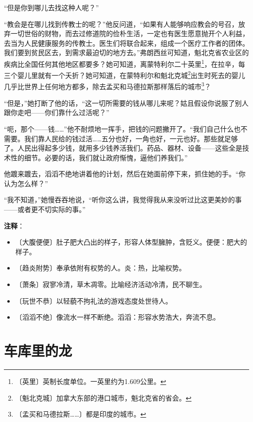 \documentclass[12pt,UTF-8,openany]{ctexbook}
\begin{document}
\begin{normalsize}
    “但是你到哪儿去找这种人呢？”
    
    “教会是在哪儿找到传教士的呢？”他反问道，“如果有人能够响应教会的号召，放弃一切世俗的财物，而去过修道院的俭朴生活，一定也有医生愿意抛开个人利益，去当为人民健康服务的传教士。医生们将联合起来，组成一个医疗工作者的团体。我们要到贫民区去，到需求最迫切的地方去。”弗朗西丝可知道，魁北克省农业区的疾病比全国任何其他地区都要多？她可知道，离蒙特利尔二十英里\footnote{〔英里〕英制长度单位。一英里约为1.609公里。}，在拉辛，每三个婴儿里就有一个夭折？她可知道，在蒙特利尔和魁北克城\footnote{〔魁北克城〕加拿大东部的港口城市，魁北克省的省会。}出生时死去的婴儿几乎比世界上任何地方都多，除去孟买和马德拉斯那样落后的城市\footnote{〔孟买和马德拉斯……〕都是印度的城市。}？
    
    “但是，”她打断了他的话，“这一切所需要的钱从哪儿来呢？姑且假设你说服了别人跟你走吧——你们靠什么过活呢？”
    
    “呃，那个——钱……”他不耐烦地一挥手，把钱的问题撇开了。“我们自己什么也不需要。我们靠人民给的钱过活……五分也好，一角也好，一元也好。那些就足够了。人民出得起多少钱，就用多少钱养活我们。药品、器材、设备——这些全是技术性的细节。必要的话，我们就让政府惭愧，逼他们养我们。”
    
    他踱来踱去，滔滔不绝地讲着他的计划，然后在她面前停下来，抓住她的手。“你认为怎么样？”
    
    “我不知道，”她慢吞吞地说，“听你这么讲，我觉得我从来没听过比这更美妙的事——或者更不切实际的事。”
    
\end{normalsize}


\newpage

\textbf{注释}：

\vspace{-1em}

\begin{itemize}
    \setlength\itemsep{-0.2em}
    \item 〔大腹便便〕肚子肥大凸出的样子，形容人体型臃肿，含贬义。便便：肥大的样子。
    \item 〔趋炎附势〕奉承依附有权势的人。炎：热，比喻权势。
    \item 〔萧条〕寂寥冷清，草木凋零。比喻经济活动冷清，民不聊生。
    \item 〔玩世不恭〕以轻藐不拘礼法的游戏态度处世待人。
    \item 〔滔滔不绝〕像流水一样不断绝。滔滔：形容水势浩大，奔流不息。
\end{itemize}

\chapter{车库里的龙}
\end{document}
